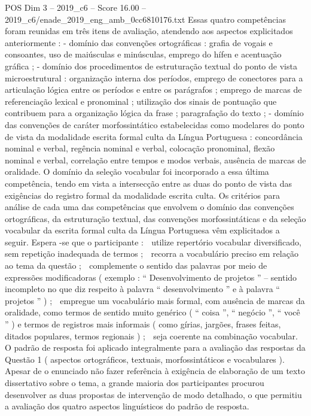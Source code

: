 \begin{textsample}{POS Dim 3 – 2019\_c6 – Score 16.00 – 2019\_c6/enade\_2019\_eng\_amb\_0cc6810176.txt}
Essas quatro competências foram reunidas em três itens de avaliação, atendendo aos aspectos explicitados anteriormente : - domínio das convenções ortográficas : grafia de vogais e consoantes, uso de maiúsculas e minúsculas, emprego do hífen e acentuação gráfica ; - domínio dos procedimentos de estruturação textual do ponto de vista microestrutural : organização interna dos períodos, emprego de conectores para a articulação lógica entre os períodos e entre os parágrafos ; emprego de marcas de referenciação lexical e pronominal ; utilização dos sinais de pontuação que contribuem para a organização lógica da frase ; paragrafação do texto ; - domínio das convenções de caráter morfossintático estabelecidas como modelares do ponto de vista da modalidade escrita formal culta da Língua Portuguesa : concordância nominal e verbal, regência nominal e verbal, colocação pronominal, flexão nominal e verbal, correlação entre tempos e modos verbais, ausência de marcas de oralidade.
O domínio da seleção vocabular foi incorporado a essa última competência, tendo em vista a intersecção entre as duas do ponto de vista das exigências do registro formal da modalidade escrita culta.
Os critérios para análise de cada uma das competências que envolvem o domínio das convenções ortográficas, da estruturação textual, das convenções morfossintáticas e da seleção vocabular da escrita formal culta da Língua Portuguesa vêm explicitados a seguir.
Espera -se que o participante :  utilize repertório vocabular diversificado, sem repetição inadequada de termos ;  recorra a vocabulário preciso em relação ao tema da questão ;  complemente o sentido das palavras por meio de expressões modificadoras ( exemplo : “ Desenvolvimento de projetos ” – sentido incompleto no que diz respeito à palavra “ desenvolvimento ” e à palavra “ projetos ” ) ;  empregue um vocabulário mais formal, com ausência de marcas da oralidade, como termos de sentido muito genérico ( “ coisa ”, “ negócio ”, “ você ” ) e termos de registros mais informais ( como gírias, jargões, frases feitas, ditados populares, termos regionais ) ;  seja coerente na combinação vocabular.
O padrão de resposta foi aplicado integralmente para a avaliação das respostas da Questão 1 ( aspectos ortográficos, textuais, morfossintáticos e vocabulares ).
Apesar de o enunciado não fazer referência à exigência de elaboração de um texto dissertativo sobre o tema, a grande maioria dos participantes procurou desenvolver as duas propostas de intervenção de modo detalhado, o que permitiu a avaliação dos quatro aspectos linguísticos do padrão de resposta.

\end{textsample}
